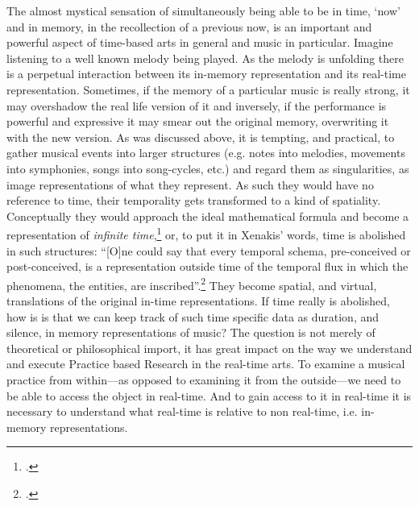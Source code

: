 The almost mystical sensation of simultaneously being able to be in time, `now' and in memory, in the recollection of a previous now, is an important and powerful aspect of time-based arts in general and music in particular. Imagine listening to a well known melody being played. As the melody is unfolding there is a perpetual interaction between its in-memory representation and its real-time representation. Sometimes, if the memory of a particular music is really strong, it may overshadow the real life version of it and inversely, if the performance is powerful and expressive it may smear out the original memory, overwriting it with the new version. As was discussed above, it is tempting, and practical, to gather musical events into larger structures (e.g. notes into melodies, movements into symphonies, songs into song-cycles, etc.) and regard them as singularities, as image representations of what they represent. As such they would have no reference to time, their temporality gets transformed to a kind of spatiality. Conceptually they would approach the ideal mathematical formula and become a representation of \emph{infinite time},\footcite{roads} or, to put it in Xenakis' words, time is abolished in such structures: ``[O]ne could say that every temporal schema, pre-conceived or post-conceived, is a representation outside time of the temporal flux in which the phenomena, the entities, are  inscribed''.\footcite[264]{xenakis71} They become spatial, and virtual, translations of the original in-time representations. If time really is abolished, how is is that we can keep track of such time specific data as duration, and silence, in memory representations of music? The question is not merely of theoretical or philosophical import, it has great impact on the way we understand and execute Practice based Research in the real-time arts. To examine a musical practice from within---as opposed to examining it from the outside---we need to be able to access the object in real-time. And to gain access to it in real-time it is necessary to understand what real-time is relative to non real-time, i.e. in-memory representations.

